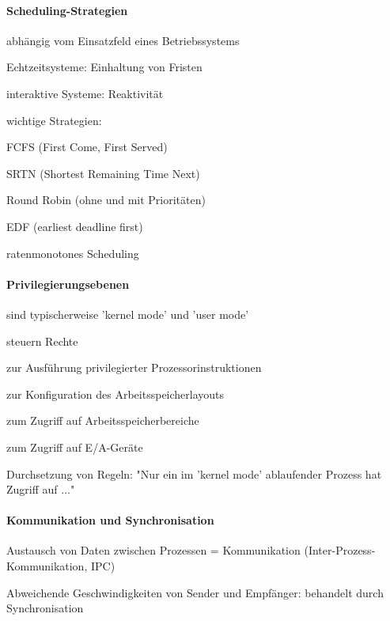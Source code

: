 \documentclass[a4paper]{article}
\begin{document}
\begin{multicols}{3}
  \paragraph{Scheduling-Strategien}
  \begin{itemize*}
    \item abhängig vom Einsatzfeld eines Betriebssystems
    \begin{itemize*}
      \item Echtzeitsysteme: Einhaltung von Fristen
      \item interaktive Systeme: Reaktivität
    \end{itemize*}
    \item wichtige Strategien:
    \begin{itemize*}
      \item FCFS (First Come, First Served)
      \item SRTN (Shortest Remaining Time Next)
      \item Round Robin (ohne und mit Prioritäten)
      \item EDF (earliest deadline first)
      \item ratenmonotones Scheduling
    \end{itemize*}
  \end{itemize*}

  \paragraph{Privilegierungsebenen}
  \begin{itemize*}
    \item sind typischerweise 'kernel mode' und 'user mode'
    \item steuern Rechte
    \begin{itemize*}
      \item zur Ausführung privilegierter Prozessorinstruktionen
      \item zur Konfiguration des Arbeitsspeicherlayouts
      \item zum Zugriff auf Arbeitsspeicherbereiche
      \item zum Zugriff auf E/A-Geräte
    \end{itemize*}
    \item Durchsetzung von Regeln: "Nur ein im 'kernel mode' ablaufender Prozess hat Zugriff auf ..."
  \end{itemize*}

  \paragraph{Kommunikation und Synchronisation}
  \begin{itemize*}
    \item Austausch von Daten zwischen Prozessen = Kommunikation (Inter-Prozess-Kommunikation, IPC)
    \item Abweichende Geschwindigkeiten von Sender und Empfänger: behandelt durch Synchronisation
  \end{itemize*}


\end{multicols}
\end{document}

